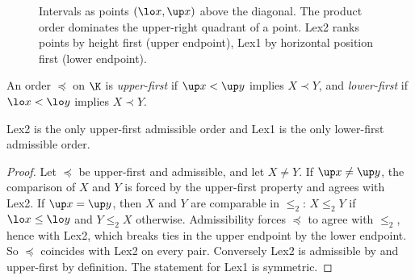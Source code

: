 \begin{figure}[t]
\centering
{}
\caption{Intervals as points $(\lo x,\up x)$ above the diagonal. The product order dominates the upper-right quadrant of a point. Lex2 ranks points by height first (upper endpoint), Lex1 by horizontal position first (lower endpoint).}
\label{fig:triangle}
\end{figure}

\begin{definition}
An order $\preceq$ on $\K$ is \emph{upper-first} if $\up x<\up y$ implies $X\prec Y$, and \emph{lower-first} if $\lo x<\lo y$ implies $X\prec Y$.
\end{definition}

\begin{lemma}[Uniqueness]\label{lem:unique}
Lex2 is the only upper-first admissible order and Lex1 is the only lower-first admissible order.
\end{lemma}

\begin{proof}
Let $\preceq$ be upper-first and admissible, and let $X\ne Y$. If $\up x\ne\up y$, the comparison of $X$ and $Y$ is forced by the upper-first property and agrees with Lex2. If $\up x=\up y$, then $X$ and $Y$ are comparable in $\le_2$: $X\le_2Y$ if $\lo x\le\lo y$ and $Y\le_2X$ otherwise. Admissibility forces $\preceq$ to agree with $\le_2$, hence with Lex2, which breaks ties in the upper endpoint by the lower endpoint. So $\preceq$ coincides with Lex2 on every pair. Conversely Lex2 is admissible by  and upper-first by definition. The statement for Lex1 is symmetric.
\end{proof}

